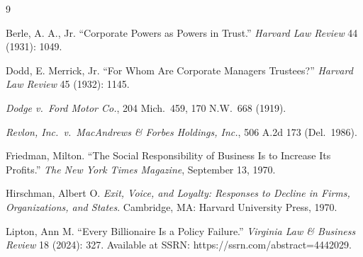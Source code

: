 \documentclass[11pt]{article}
\theoremstyle{definition}
\begin{document}
\begin{thebibliography}{9}

Berle, A. A., Jr. ``Corporate Powers as Powers in Trust.'' \textit{Harvard Law Review} 44 (1931): 1049.

Dodd, E. Merrick, Jr. ``For Whom Are Corporate Managers Trustees?'' \textit{Harvard Law Review} 45 (1932): 1145.

\textit{Dodge v.\ Ford Motor Co.}, 204 Mich.\ 459, 170 N.W.\ 668 (1919).

\textit{Revlon, Inc.\ v.\ MacAndrews \& Forbes Holdings, Inc.}, 506 A.2d 173 (Del.\ 1986).

Friedman, Milton. ``The Social Responsibility of Business Is to Increase Its Profits.'' \textit{The New York Times Magazine}, September 13, 1970.

Hirschman, Albert O. \textit{Exit, Voice, and Loyalty: Responses to Decline in Firms, Organizations, and States}. Cambridge, MA: Harvard University Press, 1970.

Lipton, Ann M. ``Every Billionaire Is a Policy Failure.'' \textit{Virginia Law \& Business Review} 18 (2024): 327. Available at SSRN: https://ssrn.com/abstract=4442029.

\end{thebibliography}
\end{document}
